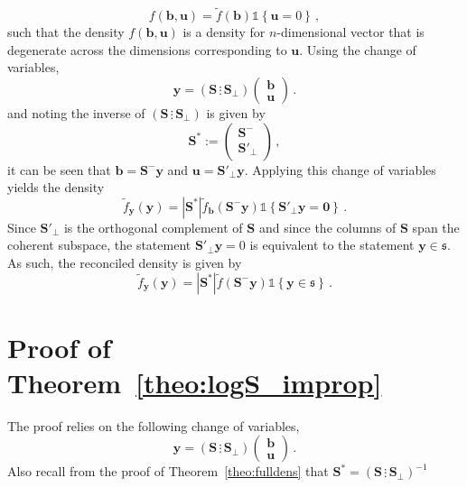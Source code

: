 \documentclass[12pt]{article}
\theoremstyle{definition}
\begin{document}
\begin{equation}
f(\bm{b},\bm{u})=\tilde{f}(\bm{b})\mathbb{1}\left\{\bm{u}=0\right\}\,,
\label{eq:densb}
\end{equation}
such that the density $f(\bm{b},\bm{u})$ is a density for $n$-dimensional vector that is degenerate across the dimensions corresponding to $\bm{u}$.  Using the change of variables,
\[
\bm{y}=\left(\bm{S}\,\vdots\,\bm{S}_{\perp}\right)\begin{pmatrix}\bm{b}\\\bm{u}
\end{pmatrix}\,.
\] 
and noting the inverse of $\left(\bm{S}\,\vdots\,\bm{S}_{\perp}\right)$ is given by
\[
\bm{S}^*:=\begin{pmatrix}\bm{S}^{-}\\\bm{S}'_{\perp}\end{pmatrix}\,,
\] 
it can be seen that $\bm{b}=\bm{S}^-\bm{y}$ and $\bm{u}=\bm{S}'_\perp\bm{y}$.  Applying this change of variables yields the density
\[
\tilde{f}_{\bm{y}}(\bm{y})=|\bm{S}^*|\tilde{f}_{\bm b}(\bm{S}^-\bm{y})\mathbb{1}\left\{\bm{S}'_\perp\bm{y}=\bm{0}\right\}\,.
\]
Since $\bm{S}'_\perp$ is the orthogonal complement of $\bm{S}$ and since the columns of $\bm{S}$ span the coherent subspace, the statement $\bm{S}'_\perp\bm{y}=0$ is equivalent to the statement $\bm{y}\in\mathfrak{s}$.  As such, the reconciled density is given by
\[
\tilde{f}_{\bm{y}}(\bm{y})=|\bm{S}^*|\tilde{f}(\bm{S}^-\bm{y})\mathbb{1}\left\{\bm{y}\in\mathfrak{s}\right\}\,.
\]

\section{Proof of Theorem~\ref{theo:logS_improp}}

The proof relies on the following change of variables, 
\[
\bm{y}=\left(\bm{S}\,\vdots\,\bm{S_\perp}\right)\begin{pmatrix}\bm{b}\\\bm{u}\end{pmatrix}\,.
\] 
Also recall from the proof of Theorem~\ref{theo:fulldens} that $\bm{S}^*=\left(\bm{S}\,\vdots\,\bm{S_\perp}\right)^{-1}$
\end{document}
